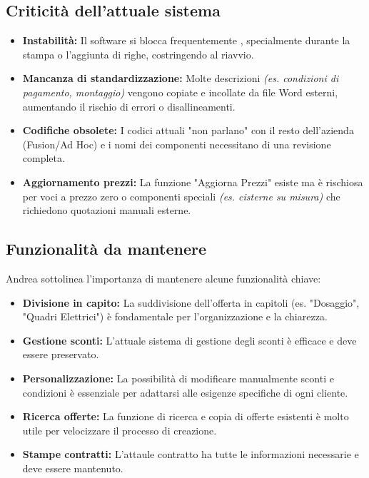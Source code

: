 \documentclass[12pt, a4paper]{article} %
\begin{document}
\subsection{Criticità dell'attuale sistema}
\begin{itemize}
    \item \textbf{Instabilità:} Il software si blocca frequentemente , specialmente durante la stampa o l'aggiunta di righe, costringendo al riavvio.
    \item \textbf{Mancanza di standardizzazione:} Molte descrizioni \textit{(es. condizioni di pagamento, montaggio)} vengono copiate e incollate da file Word esterni,
          aumentando il rischio di errori o disallineamenti.
    \item \textbf{Codifiche obsolete:} I codici attuali "non parlano" con il resto dell'azienda (Fusion/Ad Hoc) e i nomi dei componenti necessitano di una revisione completa.
    \item \textbf{Aggiornamento prezzi:} La funzione "Aggiorna Prezzi" esiste ma è rischiosa per voci a prezzo zero o componenti speciali \textit{(es. cisterne su misura)}
          che richiedono quotazioni manuali esterne.
\end{itemize}

\subsection{Funzionalità da mantenere}
Andrea sottolinea l'importanza di mantenere alcune funzionalità chiave:
\begin{itemize}
    \item \textbf{Divisione in capito:} La suddivisione dell'offerta in capitoli (es. "Dosaggio", "Quadri Elettrici") è fondamentale per l'organizzazione e la chiarezza.
    \item \textbf{Gestione sconti:} L'attuale sistema di gestione degli sconti è efficace e deve essere preservato.
    \item \textbf{Personalizzazione:} La possibilità di modificare manualmente sconti e condizioni è essenziale per adattarsi alle esigenze specifiche di ogni cliente.
    \item \textbf{Ricerca offerte:} La funzione di ricerca e copia di offerte esistenti è molto utile per velocizzare il processo di creazione.
    \item \textbf{Stampe contratti:} L'attaule contratto ha tutte le informazioni necessarie e deve essere mantenuto.
\end{itemize}
\end{document}
